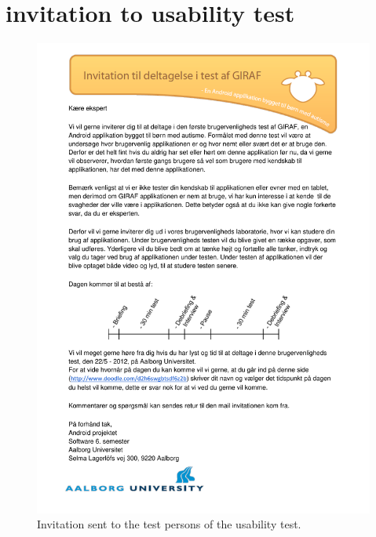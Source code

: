 \chapter{invitation to usability test}
\begin{figure}%
	\begin{center}
	\includegraphics[width=\textwidth]{input/appendices/invitation_to_usability_test.pdf}
	\end{center}
\caption{Invitation sent to the test persons of the usability test.}%
\label{appendice:usability_test}%
\end{figure}